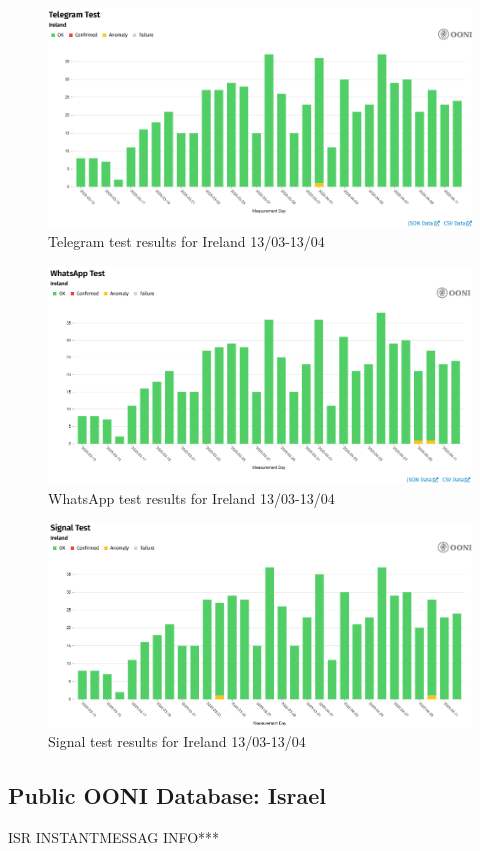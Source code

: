 \begin{figure} [H]
    \centering
    \includegraphics[width=0.5\linewidth]{IREOONIDBIMTL.png}
    \caption{Telegram test results for Ireland 13/03-13/04}
    \label{fig:enter-label}
\end{figure}

\begin{figure} [H]
    \centering
    \includegraphics[width=0.5\linewidth]{IREOONIDBIMWHATS.png}
    \caption{WhatsApp test results for Ireland 13/03-13/04}
    \label{fig:enter-label}
\end{figure}

\begin{figure} [H]
    \centering
    \includegraphics[width=0.5\linewidth]{IREOONIDBSIG.png}
    \caption{Signal test results for Ireland 13/03-13/04}
    \label{fig:enter-label}
\end{figure}



\subsection{Public OONI Database: Israel}
ISR INSTANTMESSAG INFO***

